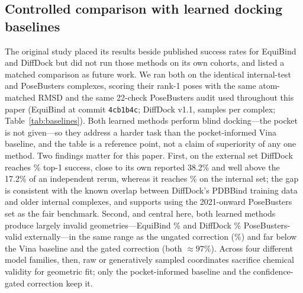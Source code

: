 \documentclass[preprint,12pt,authoryear]{elsarticle}
\begin{document}
\subsection{Controlled comparison with learned docking baselines}\label{sec:baselines}
The original study placed its results beside published success rates for EquiBind and DiffDock but did not run those
methods on its own cohorts, and listed a matched comparison as future work. We ran both on the identical internal-test and
PoseBusters complexes, scoring their rank-1 poses with the same atom-matched RMSD and the same \num{22}-check PoseBusters
audit used throughout this paper (EquiBind at commit \texttt{4cb1b4c}; DiffDock v1.1, \DDSamples{} samples per complex;
Table~\ref{tab:baselines}). Both learned methods perform blind docking---the pocket is not given---so they address a harder
task than the pocket-informed Vina baseline, and the table is a reference point, not a claim of superiority of any one method.
Two findings matter for this paper. First, on the external set DiffDock reaches \DDSuccExt\% top-1 success, close to its own
reported \num{38.2}\% and well above the \num{17.2}\% of an independent rerun, whereas it reaches \DDSuccInt\% on the internal
set; the gap is consistent with the known overlap between DiffDock's PDBBind training data and older internal complexes, and
supports using the 2021-onward PoseBusters set as the fair benchmark. Second, and central here, both learned methods produce
largely invalid geometries---EquiBind \EqBPassExt\% and DiffDock \DDPassExt\% PoseBusters-valid externally---in the same range
as the ungated correction (\PassUngExt\%) and far below the Vina baseline and the gated correction (both $\approx\!\num{97}$\%).
Across four different model families, then, raw or generatively sampled coordinates sacrifice chemical validity for geometric
fit; only the pocket-informed baseline and the confidence-gated correction keep it.
\end{document}
